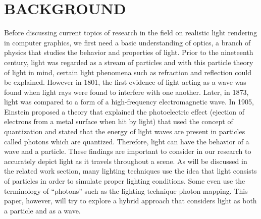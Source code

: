 \chapter{BACKGROUND}

Before discussing current topics of research in the field on realistic light rendering in computer graphics, we first need a basic understanding of optics, a branch of physics that studies the behavior and properties of light.  Prior to the nineteenth century, light was regarded as a stream of particles and with this particle theory of light in mind, certain light phenomena such as refraction and reflection could be explained.  However in 1801, the first evidence of light acting as a wave was found when light rays were found to interfere with one another.  Later, in 1873, light was compared to a form of a high-frequency electromagnetic wave.  In 1905, Einstein proposed a theory that explained the photoelectric effect (ejection of electrons from a metal surface when hit by light) that used the concept of quantization and stated that the energy of light waves are present in particles called photons which are quantized.  \cite{Serway2004}  Therefore, light can have the behavior of a wave and a particle.  These findings are important to consider in our research to accurately depict light as it travels throughout a scene.  As will be discussed in the related work section, many lighting techniques use the idea that light consists of particles in order to simulate proper lighting conditions.  Some even use the terminology of “photons” such as the lighting technique photon mapping.  This paper, however, will try to explore a hybrid approach that considers light as both a particle and as a wave.

